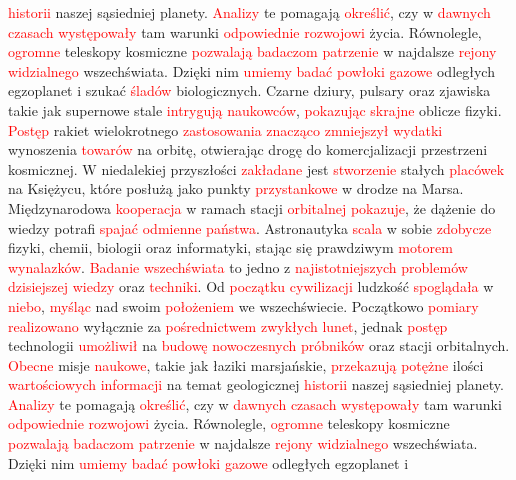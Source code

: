 \documentclass[12pt,a4paper]{article}
\begin{document}
\textcolor{red}{historii} naszej sąsiedniej planety. \textcolor{red}{Analizy} te pomagają \textcolor{red}{określić}, czy w \textcolor{red}{dawnych} \textcolor{red}{czasach} \textcolor{red}{występowały} tam warunki \textcolor{red}{odpowiednie} \textcolor{red}{rozwojowi} życia. Równolegle, \textcolor{red}{ogromne} teleskopy kosmiczne \textcolor{red}{pozwalają} \textcolor{red}{badaczom} \textcolor{red}{patrzenie} w najdalsze \textcolor{red}{rejony} \textcolor{red}{widzialnego} wszechświata. Dzięki nim \textcolor{red}{umiemy} \textcolor{red}{badać} \textcolor{red}{powłoki} \textcolor{red}{gazowe} odległych egzoplanet i szukać \textcolor{red}{śladów} biologicznych. Czarne dziury, pulsary oraz zjawiska takie jak supernowe stale \textcolor{red}{intrygują} \textcolor{red}{naukowców}, \textcolor{red}{pokazując} \textcolor{red}{skrajne} oblicze fizyki. \textcolor{red}{Postęp} rakiet wielokrotnego \textcolor{red}{zastosowania} \textcolor{red}{znacząco} \textcolor{red}{zmniejszył} \textcolor{red}{wydatki} wynoszenia \textcolor{red}{towarów} na orbitę, otwierając drogę do komercjalizacji przestrzeni kosmicznej. W niedalekiej przyszłości \textcolor{red}{zakładane} jest \textcolor{red}{stworzenie} stałych \textcolor{red}{placówek} na Księżycu, które posłużą jako punkty \textcolor{red}{przystankowe} w drodze na Marsa. Międzynarodowa \textcolor{red}{kooperacja} w ramach stacji \textcolor{red}{orbitalnej} \textcolor{red}{pokazuje}, że dążenie do wiedzy potrafi \textcolor{red}{spajać} \textcolor{red}{odmienne} \textcolor{red}{państwa}. Astronautyka \textcolor{red}{scala} w sobie \textcolor{red}{zdobycze} fizyki, chemii, biologii oraz informatyki, stając się prawdziwym \textcolor{red}{motorem} \textcolor{red}{wynalazków}. \textcolor{red}{Badanie} \textcolor{red}{wszechświata} to jedno z \textcolor{red}{najistotniejszych} \textcolor{red}{problemów} \textcolor{red}{dzisiejszej} \textcolor{red}{wiedzy} oraz \textcolor{red}{techniki}. Od \textcolor{red}{początku} \textcolor{red}{cywilizacji} ludzkość \textcolor{red}{spoglądała} w \textcolor{red}{niebo}, \textcolor{red}{myśląc} nad swoim \textcolor{red}{położeniem} we wszechświecie. Początkowo \textcolor{red}{pomiary} \textcolor{red}{realizowano} wyłącznie za \textcolor{red}{pośrednictwem} \textcolor{red}{zwykłych} \textcolor{red}{lunet}, jednak \textcolor{red}{postęp} technologii \textcolor{red}{umożliwił} na \textcolor{red}{budowę} \textcolor{red}{nowoczesnych} \textcolor{red}{próbników} oraz stacji orbitalnych. \textcolor{red}{Obecne} misje \textcolor{red}{naukowe}, takie jak łaziki marsjańskie, \textcolor{red}{przekazują} \textcolor{red}{potężne} ilości \textcolor{red}{wartościowych} \textcolor{red}{informacji} na temat geologicznej \textcolor{red}{historii} naszej sąsiedniej planety. \textcolor{red}{Analizy} te pomagają \textcolor{red}{określić}, czy w \textcolor{red}{dawnych} \textcolor{red}{czasach} \textcolor{red}{występowały} tam warunki \textcolor{red}{odpowiednie} \textcolor{red}{rozwojowi} życia. Równolegle, \textcolor{red}{ogromne} teleskopy kosmiczne \textcolor{red}{pozwalają} \textcolor{red}{badaczom} \textcolor{red}{patrzenie} w najdalsze \textcolor{red}{rejony} \textcolor{red}{widzialnego} wszechświata. Dzięki nim \textcolor{red}{umiemy} \textcolor{red}{badać} \textcolor{red}{powłoki} \textcolor{red}{gazowe} odległych egzoplanet i 
\end{document}
